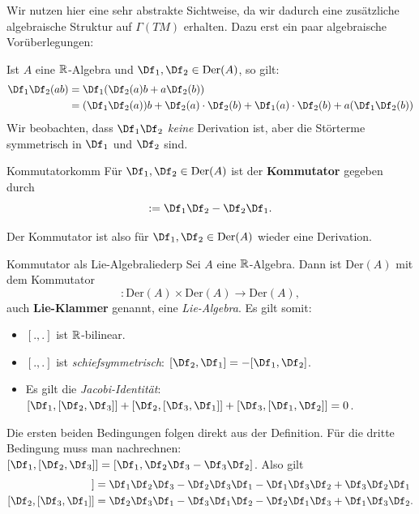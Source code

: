 Wir nutzen hier eine sehr abstrakte Sichtweise, da wir dadurch eine zusätzliche algebraische Struktur auf $\Gamma (TM)$ erhalten. Dazu erst ein paar algebraische Vorüberlegungen:
\begin{bemerkung}
Ist $A$ eine $\mathbb{R}$-Algebra und $\Df_1, \Df_2 \in \text{Der}(A)$, so gilt:
\begin{align}
\Df_1 \Df_2 (ab) &= \Df_1 (\Df_2 (a)b+ a \Df_2(b))\\
&=(\Df_1 \Df_2 (a))b + \Df_2(a)\cdot \Df_2(b) + \Df_1 (a) \cdot \Df_2 (b) + a (\Df_1 \Df_2 (b))
\end{align}
Wir beobachten, dass $\Df_1 \Df_2$ \textit{keine} Derivation ist, aber die Störterme symmetrisch in $\Df_1$ und $\Df_2$ sind.
\end{bemerkung}
\begin{definition}{Kommutator}{komm}
Für $\Df_1, \Df_2 \in \text{Der} (A)$ ist der \textbf{Kommutator} gegeben durch
\begin{equation}
[\Df_1, \Df_2] := \Df_1 \Df_2 - \Df_2 \Df_1.
\end{equation}
\end{definition}
Der Kommutator ist also für $\Df_1, \Df_2 \in \text{Der} (A)$ wieder eine Derivation.
\begin{satz}{Kommutator als Lie-Algebra}{liederp}
Sei $A$ eine $\mathbb{R}$-Algebra. Dann ist $\text{Der} (A)$ mit dem Kommutator
\begin{equation}
[., .]: \text{Der} (A) \times \text{Der} (A) \to \text{Der} (A),
\end{equation}
auch \textbf{Lie-Klammer} genannt, eine \textit{Lie-Algebra}. Es gilt somit:
\begin{itemize}
\item $[., .]$ ist $\mathbb{R}$-bilinear.
\item $[., .]$ ist \textit{schiefsymmetrisch}: $ [ \Df_2, \Df_1] = - [\Df_1, \Df_2 ]$.
\item Es gilt die \textit{Jacobi-Identität}: $[\Df_1, [\Df_2, \Df_3]] + [\Df_2, [\Df_3, \Df_1]] + [\Df_3, [\Df_1, \Df_2]] = 0$.
\end{itemize}
\end{satz}
\begin{beweis}
Die ersten beiden Bedingungen folgen direkt aus der Definition. Für die dritte Bedingung muss man nachrechnen: $[\Df_1, [\Df_2, \Df_3]] = [\Df_1, \Df_2\Df_3-\Df_3\Df_2]$. Also gilt
\begin{align}
[\Df_1, [\Df_2, \Df_3]] &= \Df_1\Df_2\Df_3 - \Df_2\Df_3\Df_1-\Df_1\Df_3\Df_2 + \Df_3\Df_2\Df_1\\
[\Df_2, [\Df_3, \Df_1]] &= \Df_2\Df_3\Df_1 - \Df_3\Df_1\Df_2-\Df_2\Df_1\Df_3 + \Df_1\Df_3\Df_2.
\end{align}
\end{beweis}
